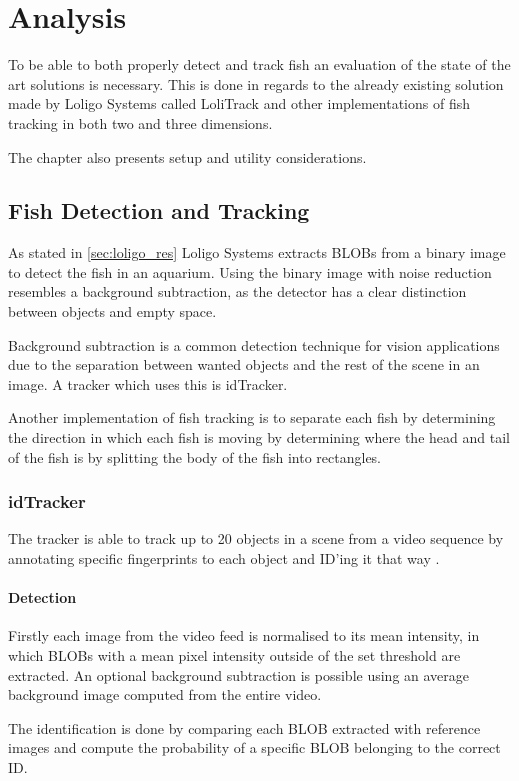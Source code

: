 \graphicspath{{figures/analysis/}}
\chapter{Analysis}\label{ch:analysis}
To be able to both properly detect and track fish an evaluation of the state of the art solutions is necessary. This is done in regards to the already existing solution made by Loligo Systems called LoliTrack and other implementations of fish tracking in both two and three dimensions.

The chapter also presents setup and utility considerations.

\section{Fish Detection and Tracking}
As stated in \autoref{sec:loligo_res} Loligo Systems extracts BLOBs from a binary image to detect the fish in an aquarium. Using the binary image with noise reduction resembles a background subtraction, as the detector has a clear distinction between objects and empty space.

Background subtraction is a common detection technique for vision applications due to the separation between wanted objects and the rest of the scene in an image. A tracker which uses this is idTracker.

Another implementation of fish tracking is to separate each fish by determining the direction in which each fish is moving by determining where the head and tail of the fish is by splitting the body of the fish into rectangles.

\subsection{idTracker}
The tracker is able to track up to 20 objects in a scene from a video sequence by annotating specific fingerprints to each object and ID'ing it that way \citep{idtracker2014}.

\subsubsection{Detection}
Firstly each image from the video feed is normalised to its mean intensity, in which BLOBs with a mean pixel intensity outside of the set threshold are extracted. An optional background subtraction is possible using an average background image computed from the entire video.

The identification is done by comparing each BLOB extracted with reference images and compute the probability of a specific BLOB belonging to the correct ID.

